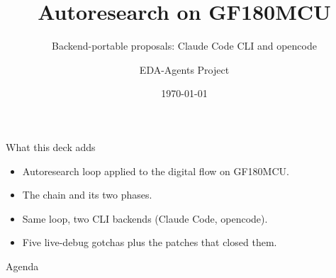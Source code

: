 \documentclass[aspectratio=169,11pt]{beamer}
\title{Autoresearch on GF180MCU}
\subtitle{Backend-portable proposals: Claude Code CLI and opencode}
\author{EDA-Agents Project}
\institute{Open-Source IC Design}
\date{\today}
\begin{document}
\begin{frame}[plain]
  \titlepage
\end{frame}

\begin{frame}{What this deck adds}
  \begin{itemize}
    \item Autoresearch loop applied to the digital flow on GF180MCU.
    \item The  chain and its two phases.
    \item Same loop, two CLI backends (Claude Code, opencode).
    \item Five live-debug gotchas plus the patches that closed them.
  \end{itemize}
\end{frame}

\begin{frame}{Agenda}
  \tableofcontents
\end{frame}








\ifchipathon
  
\fi
\end{document}
